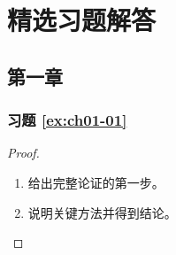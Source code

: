 \chapter{精选习题解答}
\label{ch:solutions}

%

\section{第一章}

\subsection*{习题 \ref{ex:ch01-01}}
\label{sol:ch01-01}

\quad
{}

\begin{proof}
\leavevmode
\begin{enumerate}
  \item 给出完整论证的第一步。
  \item 说明关键方法并得到结论。
\end{enumerate}
\end{proof}

